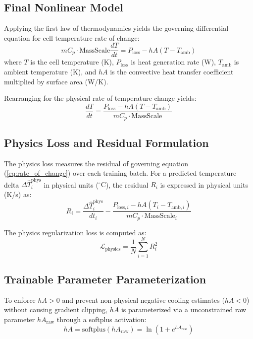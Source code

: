 \documentclass[12pt,a4paper]{article}
\begin{document}
\subsection{Final Nonlinear Model}
Applying the first law of thermodynamics yields the governing differential equation for cell temperature rate of change:
\begin{equation}
m C_p \cdot \text{MassScale} \frac{dT}{dt} = P_{\text{loss}} - hA (T - T_{\text{amb}})
\label{eq:nonlinear_model}
\end{equation}
where $T$ is the cell temperature (K), $P_{\text{loss}}$ is heat generation rate (W), $T_{\text{amb}}$ is ambient temperature (K), and $hA$ is the convective heat transfer coefficient multiplied by surface area (W/K).

Rearranging for the physical rate of temperature change yields:
\begin{equation}
\frac{dT}{dt} = \frac{P_{\text{loss}} - hA(T - T_{\text{amb}})}{m C_p \cdot \text{MassScale}}
\label{eq:rate_of_change}
\end{equation}

\subsection{Physics Loss and Residual Formulation}
The physics loss measures the residual of governing equation (\ref{eq:rate_of_change}) over each training batch. For a predicted temperature delta $\Delta \hat{T}_i^{\text{phys}}$ in physical units ($^\circ\text{C}$), the residual $R_i$ is expressed in physical units (K/s) as:
\begin{equation}
R_i = \frac{\Delta \hat{T}_i^{\text{phys}}}{dt_i} - \frac{P_{\text{loss}, i} - hA (T_i - T_{\text{amb}, i})}{m C_p \cdot \text{MassScale}_i}
\label{eq:residual}
\end{equation}

The physics regularization loss is computed as:
\begin{equation}
\mathcal{L}_{\text{physics}} = \frac{1}{N} \sum_{i=1}^N R_i^2
\label{eq:loss_physics}
\end{equation}

\subsection{Trainable Parameter Parameterization}
To enforce $hA > 0$ and prevent non-physical negative cooling estimates ($hA < 0$) without causing gradient clipping, $hA$ is parameterized via a unconstrained raw parameter $hA_{\text{raw}}$ through a softplus activation:
\begin{equation}
hA = \text{softplus}(hA_{\text{raw}}) = \ln(1 + e^{hA_{\text{raw}}})
\label{eq:softplus}
\end{equation}
\end{document}
